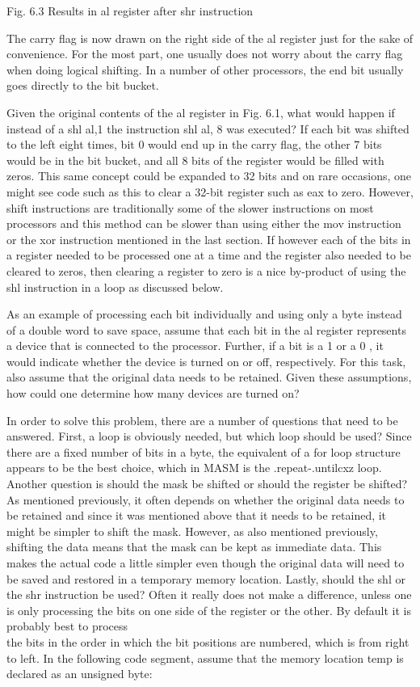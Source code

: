 \documentclass[10pt]{article}
\begin{document}
Fig. 6.3 Results in al register after shr instruction

The carry flag is now drawn on the right side of the al register just for the sake of convenience. For the most part, one usually does not worry about the carry flag when doing logical shifting. In a number of other processors, the end bit usually goes directly to the bit bucket.

Given the original contents of the al register in Fig. 6.1, what would happen if instead of a shl al,1 the instruction shl al, 8 was executed? If each bit was shifted to the left eight times, bit 0 would end up in the carry flag, the other 7 bits would be in the bit bucket, and all 8 bits of the register would be filled with zeros. This same concept could be expanded to 32 bits and on rare occasions, one might see code such as this to clear a 32-bit register such as eax to zero. However, shift instructions are traditionally some of the slower instructions on most processors and this method can be slower than using either the mov instruction or the xor instruction mentioned in the last section. If however each of the bits in a register needed to be processed one at a time and the register also needed to be cleared to zeros, then clearing a register to zero is a nice by-product of using the shl instruction in a loop as discussed below.

As an example of processing each bit individually and using only a byte instead of a double word to save space, assume that each bit in the al register represents a device that is connected to the processor. Further, if a bit is a 1 or a 0 , it would indicate whether the device is turned on or off, respectively. For this task, also assume that the original data needs to be retained. Given these assumptions, how could one determine how many devices are turned on?

In order to solve this problem, there are a number of questions that need to be answered. First, a loop is obviously needed, but which loop should be used? Since there are a fixed number of bits in a byte, the equivalent of a for loop structure appears to be the best choice, which in MASM is the .repeat-.untilcxz loop. Another question is should the mask be shifted or should the register be shifted? As mentioned previously, it often depends on whether the original data needs to be retained and since it was mentioned above that it needs to be retained, it might be simpler to shift the mask. However, as also mentioned previously, shifting the data means that the mask can be kept as immediate data. This makes the actual code a little simpler even though the original data will need to be saved and restored in a temporary memory location. Lastly, should the shl or the shr instruction be used? Often it really does not make a difference, unless one is only processing the bits on one side of the register or the other. By default it is probably best to process\\
the bits in the order in which the bit positions are numbered, which is from right to left. In the following code segment, assume that the memory location temp is declared as an unsigned byte:
\end{document}
